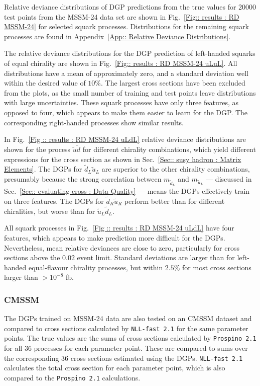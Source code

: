 \documentclass[twoside,english]{uiofysmaster}
\begin{document}
{Relative deviance distributions of DGP predictions from the true values for 20000 test points from the MSSM-24 data set are shown in Fig.~\ref{Fig:: results : RD MSSM-24} for selected squark processes. Distributions for the remaining squark processes are found in Appendix~\ref{App:: Relative Deviance Distributions}.

The relative deviance distributions for the DGP prediction of left-handed squarks of equal chirality are shown in Fig.~\ref{Fig:: results : RD MSSM-24 uLuL}. All distributions have a mean of approximately zero, and a standard deviation well within the desired value of $10 \%$. The largest cross sections have been excluded from the plots, as the small number of training and test points leave distributions with large uncertainties. These squark processes have only three features, as opposed to four, which appears to make them easier to learn for the DGP. The corresponding right-handed processes show similar results.

In Fig.~\ref{Fig :: results : RD MSSM-24 uLdL}  relative deviance distributions are shown for the process $\widetilde{u} \widetilde{d}$ for different chirality combinations, which yield different expressions for the cross section as shown in Sec.~\ref{Sec:: susy hadron : Matrix Elements}. The DGPs for $\widetilde{d}_L \widetilde{u}_L$ are superior to the other chirality combinations, presumably because the strong correlation between $m_{\widetilde{d}_L}$ and $m_{\widetilde{u}_L}$ --- discussed in Sec.~\ref{Sec:: evaluating cross : Data Quality} --- means the DGPs effectively train on three features. The DGPs for $\widetilde{d}_R \widetilde{u}_R$ perform better than for different chiralities, but worse than for $\widetilde{u}_L\widetilde{d}_L$. 

All squark processes in Fig.~\ref{Fig :: results : RD MSSM-24 uLdL} have four features, which appears to make prediction more difficult for the DGPs. Nevertheless, mean relative deviances are close to zero, particularly for cross sections above the $0.02$ event limit. Standard deviations are larger than for left-handed equal-flavour chirality processes, but within $2.5\%$ for most cross sections larger than $> 10^{-8}$ fb.

\subsubsection{CMSSM}

The DGPs trained on MSSM-24 data are also tested on an CMSSM dataset and compared to cross sections calculated by \verb|NLL-fast 2.1| for the same parameter points. The true values are the sums of cross sections calculated by \verb|Prospino 2.1| for all 36 processes for each parameter point. These are compared to sums over the corresponding 36 cross sections estimated using the DGPs. \verb|NLL-fast 2.1| calculates the total cross section for each parameter point, which is also compared to the \verb|Prospino 2.1| calculations.

}
\end{document}
